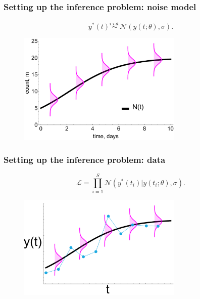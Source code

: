 \documentclass[handout]{beamer}
\begin{document}
\begin{frame}
	\frametitle{Setting up the inference problem: noise model}
	
	
	\begin{equation}
	y^*(t) \stackrel{i.i.d.}{\sim} \mathcal{N}(y(t;\theta), \sigma).
	\end{equation}
	
	\begin{figure}
		\centerline{\includegraphics[width=0.7\textwidth]{./Figures/lec7_odeSingleBulding2.pdf}}
	\end{figure}
	
\end{frame}

\begin{frame}
	\frametitle{Setting up the inference problem: data}
	
	\begin{equation}
	\mathcal{L} = \prod_{i=1}^{S} \mathcal{N}(y^*(t_i)| y(t_i;\theta), \sigma).
	\end{equation}
	
	\begin{figure}
		\centerline{\includegraphics[width=0.7\textwidth]{./Figures/lec7_odeSingleBulding2_data.pdf}}
	\end{figure}
	
\end{frame}
\end{document}
